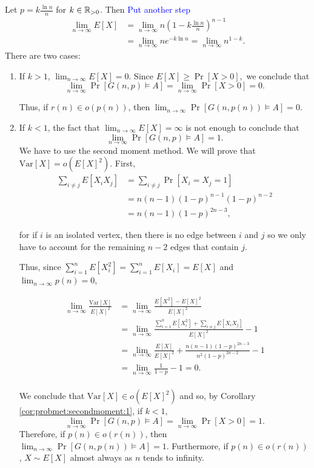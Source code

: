 Let $\displaystyle{p = k\frac{\ln n}{n}}$ for $k \in \mathbb{R}_{>0}$. Then \textcolor{blue}{Put another step}
\begin{align*}
    \lim_{n \to \infty} E[X] &= \lim_{n \to \infty} n\left(1 - k\frac{\ln n}{n}\right)^{n - 1} \\
    &= \lim_{n \to \infty} ne^{-k\ln n} = \lim_{n \to \infty} n^{1 - k}.
\end{align*}
There are two cases: \par
\begin{enumerate}
    \item If $k > 1$, $\lim_{n \to \infty} E[X] = 0$. Since \(E[X] \geq \Pr[X > 0],\) we conclude that \[\lim_{n \to \infty} \Pr[G(n, p) \vDash A] =  \lim_{n \to \infty} \Pr[X > 0] = 0.\] \par
    Thus, if $r(n) \in o(p(n))$, then $\lim_{n \to \infty} \Pr[G(n, p(n)) \vDash A] = 0$. \par
    \item If $k < 1$, the fact that $\lim_{n \to \infty} E[X] = \infty$ is not enough to conclude that \[\lim_{n \to \infty} \Pr[G(n, p) \vDash A] = 1.\] 
    We have to use the second moment method.  We will prove that $\text{Var} [X] = o(E[X]^2)$. First, 
    \begin{align*}
        \sum_{i \neq j}E[X_iX_j] &= \sum_{i \neq j} \Pr[X_i = X_j = 1] \\
        &= n(n - 1)(1 - p)^{n -1}(1 - p)^{n - 2} \\ &= n(n - 1)(1 - p)^{2n - 3},
    \end{align*}
    
    for if $i$ is an isolated vertex, then there is no edge between $i$ and $j$ so we only have to account for the remaining $n - 2$ edges that contain $j$.  \par
    
    Thus, since $\sum_{i = 1}^{n}E[X_i^2] =  \sum_{i = 1}^n E[X_i] = E[X]$ and $\lim_{n \to \infty} p(n) = 0$,
    
    \begin{align*}
        \lim_{n \to \infty} \frac{\text{Var}[X]}{E[X]^2} &= 
        \lim_{n \to \infty}\frac{E[X^2] - E[X]^2}{E[X]^2} \\
        &= \lim_{n \to \infty} \frac{\sum_{i = 1}^n E[X_i^2] + \sum_{i \neq j}E[X_iX_j]}{E[X]^2} - 1 \\ &= \lim_{n \to \infty} \frac{E[X]}{E[X]^2} +\frac{ n(n - 1)(1 - p)^{2n - 3}}{n^2(1 - p)^{2n - 2}} - 1 \\
        & = \lim_{n \to \infty} \frac{1}{1 - p} - 1 = 0.\\
    \end{align*} \par
    We conclude that $\text{Var}[X] \in o(E[X]^2)$ and so, by Corollary \ref{cor:probmet:secondmoment:1}, if $k < 1$, 
    \[\lim_{n \to \infty} \Pr[G(n, p) \vDash A] = \lim_{n \to \infty} \Pr[X > 0] = 1.\] 
    Therefore, if $p(n) \in o(r(n))$, then $\lim_{n \to \infty} \Pr[G(n, p(n)) \vDash A] = 1$. Furthermore, if $p(n) \in o(r(n))$, $X \sim E[X]$ almost always as $n$ tends to infinity.  \par
\end{enumerate}
